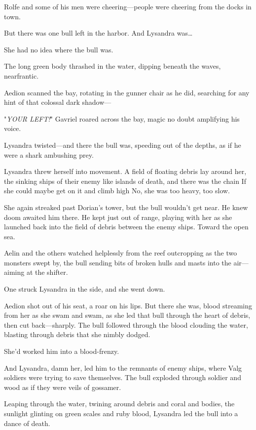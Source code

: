 Rolfe and some of his men were cheering---people were cheering from the docks in town.

But there was one bull left in the harbor. And Lysandra was\ldots{}

She had no idea where the bull was.

The long green body thrashed in the water, dipping beneath the waves, nearfrantic.

Aedion scanned the bay, rotating in the gunner chair as he did, searching for any hint of that colossal dark shadow---

"\emph{YOUR LEFT!}" Gavriel roared across the bay, magic no doubt amplifying his voice.

Lysandra twisted---and there the bull was, speeding out of the depths, as if he were a shark ambushing prey.

Lysandra threw herself into movement. A field of floating debris lay around her, the sinking ships of their enemy like islands of death, and there was the chain  If she could maybe get on it and climb high
 No, she was too heavy, too slow.

She again streaked past Dorian's tower, but the bull wouldn't get near. He knew doom awaited him there. He kept just out of range, playing with her as she launched back into the field of debris between the enemy ships. Toward the open sea.

Aelin and the others watched helplessly from the reef outcropping as the two monsters swept by, the bull sending bits of broken hulls and masts into the air--- aiming at the shifter.

One struck Lysandra in the side, and she went down.

Aedion shot out of his seat, a roar on his lips. But there she was, blood streaming from her as she swam and swam, as she led that bull through the heart of debris, then cut back---sharply. The bull followed through the blood clouding the water, blasting through debris that she nimbly dodged.

She'd worked him into a blood-frenzy.

And Lysandra, damn her, led him to the remnants of enemy ships, where Valg soldiers were trying to save themselves. The bull exploded through soldier and wood as if they were veils of gossamer.

Leaping through the water, twining around debris and coral and bodies, the sunlight glinting on green scales and ruby blood, Lysandra led the bull into a dance of death.

